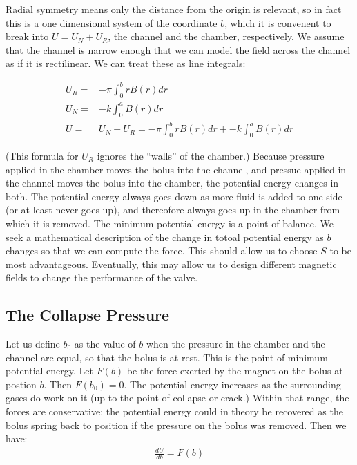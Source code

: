 \documentclass{asme2ej}
\begin{document}
Radial symmetry means only the distance from the origin is relevant, so
in fact this is a one dimensional system of the coordinate $b$, which
it is convenent to break into $U = U_N + U_R$,
the channel and the chamber, respectively. We assume that the channel is narrow
enough that we can model the field across the channel as if it is rectilinear.
We can treat these as line integrals:

\begin{align}
  U_R = & -\pi \int_0^b r B(r) dr \\
  U_N = & -k\int_0^a B(r) dr\\
  U = & U_N + U_R = -\pi \int_0^b r B(r) dr  + -k\int_0^a B(r) dr
\end{align}

(This formula for $U_R$ ignores the ``walls'' of the chamber.)
Because pressure applied in the chamber moves the bolus
into the channel, and pressue applied in the channel moves
the bolus into the chamber, the
potential energy changes in both.
The potential energy always goes down as more fluid is added to one side (or
at least never goes up), and thereofore always goes up in the chamber from which it is removed.
The minimum potential energy is a point of balance.
We seek a mathematical description of the
change in totoal potential energy as $b$ changes so
that we can compute the force.
This should allow us to choose $S$ to be most advantageous.
Eventually, this may allow us to design different
magnetic fields to change the performance of the valve.



\subsection{The Collapse Pressure}

Let us define $b_0$ as the value of $b$ when the pressure in the chamber and the channel are equal,
so that the bolus is at rest. This is the point of minimum potential energy.
Let $F(b)$ be the force exerted by the magnet on the bolus at postion $b$.
Then $F(b_0) = 0$.
The potential energy increases as the surrounding gases do work on it (up to the point of collapse
or crack.)
Within that range, the forces are conservative; the potential energy could in theory
be recovered as the bolus spring back to position
if the pressure on the bolus was removed.
Then we have:
\begin{align}
  \frac{d U}{db} =  F(b)
\end{align}
\end{document}
